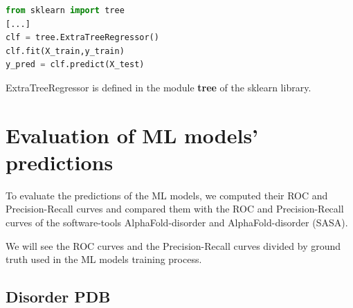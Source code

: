\begin{lstlisting}[language=Python, caption=Extra Tree implementation]
from sklearn import tree
[...]
clf = tree.ExtraTreeRegressor()
clf.fit(X_train,y_train)
y_pred = clf.predict(X_test)
\end{lstlisting}

ExtraTreeRegressor is defined in the module \textbf{tree} of the sklearn library.

\vspace{5em}

\section{Evaluation of ML models' predictions}

To evaluate the predictions of the ML models, we computed their ROC and Precision-Recall curves and compared them with the ROC and Precision-Recall curves of the software-tools AlphaFold-disorder and AlphaFold-disorder (SASA).

We will see the ROC curves and the Precision-Recall curves divided by ground truth used in the ML models training process.

\vspace{5em}

\pagebreak

\subsection{Disorder PDB}


